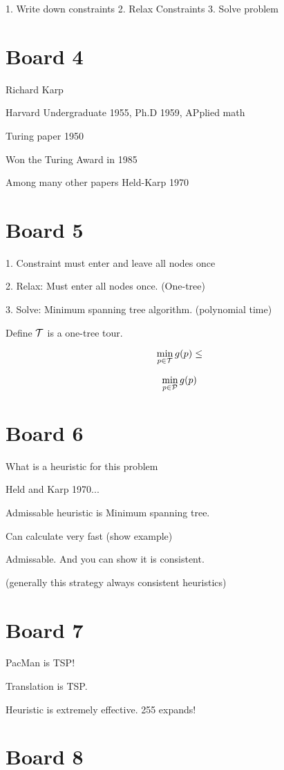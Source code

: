 \documentclass[10pt]{article}
\begin{document}
1. Write down constraints
2. Relax Constraints
3. Solve problem

\section{Board 4}

Richard Karp

Harvard Undergraduate 1955, Ph.D 1959, APplied math

Turing paper 1950

Won the Turing Award in 1985

Among many other papers Held-Karp 1970


\section{Board 5}

1. Constraint must enter and leave all nodes once

2. Relax: Must enter all nodes once. (One-tree)
  
3. Solve: Minimum spanning tree algorithm. (polynomial time)

Define ${\cal T}$ is a one-tree tour.

\[ \min_{p \in {\cal T}} g(p) \leq \] 

\[ \min_{p \in {\cal P}} g(p) \] 


\section{Board 6}

What is a heuristic for this problem 

Held and Karp 1970...

Admissable heuristic is Minimum spanning tree. 

Can calculate very fast (show example)

Admissable. And you can show it is consistent.

(generally this strategy always consistent heuristics)

\section{Board 7}

PacMan is TSP! 

Translation is TSP.

Heuristic is extremely effective. 255 expands!

\section{Board 8}
\end{document}
